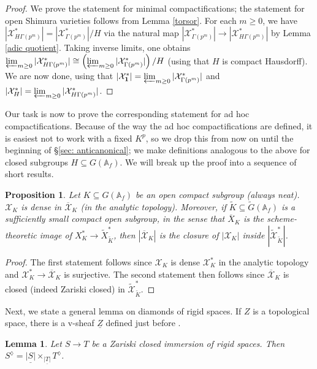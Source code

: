 \documentclass{amsart}
\newtheorem{lemma}[subsubsection]{Lemma}
\newtheorem{prop}[subsubsection]{Proposition}
\theoremstyle{remark}
\numberwithin{equation}{subsection}
\newcommand{\A}{\AA}
\renewcommand{\AA}{{\mathbb A}}
\newcommand{\cX}{{\mathcal X}}
\newcommand*{\invlim}{\varprojlim}
\newcommand{\mbf}{\mathbf}
\newcommand{\tG}{\widetilde{G}}
\newcommand{\tK}{{\widetilde{K}}}
\newcommand{\tX}{\widetilde{X}}
\newcommand{\tcX}{\widetilde{\mathcal{X}}}
\newcommand{\ocX}{\overline{\mathcal{X}}}
\newcommand{\ol}{\overline}
\newcommand{\ul}{\underline}
\newcommand{\sub}{\subseteq}
\renewcommand{\(}{\left(}
\renewcommand{\)}{\right)}
\begin{document}
\begin{proof}
We prove the statement for minimal compactifications; the statement for open Shimura varieties follows from Lemma \ref{torsor}. For each $m\geq 0$, we have $|\cX^{\ast}_{H \Gamma(p^{m})}|=|\cX^{\ast}_{\Gamma(p^{m})}|/H$ via the natural map $|\cX^{\ast}_{\Gamma(p^{m})}| \to |\cX^{\ast}_{H \Gamma(p^{m})}|$ by Lemma \ref{adic quotient}.  Taking inverse limits, one obtains $\varprojlim_{m\geq 0}|\cX^\ast_{H\Gamma(p^m)}| \cong \left( \varprojlim_{m\geq 0} |\cX^\ast_{\Gamma(p^m)}| \right) /H $ (using that $H$ is compact Hausdorff). We are now done, using that $|\cX_{\mbf{1}}^{\ast}|=\invlim_{m\geq 0}|\cX_{\Gamma(p^{m})}^{\ast}|$ and $|\cX^{\ast}_H|=\invlim_{m\geq 0}|\cX_{H\Gamma(p^{m})}^{\ast}|$.
\end{proof}

Our task is now to prove the corresponding statement for ad hoc compactifications. Because of the way the ad hoc compactifications are defined, it is easiest not to work with a fixed $K^p$, so we drop this from now on until the beginning of \S \ref{sec: anticanonical}; we make definitions analogous to the above for closed subgroups $H \sub G(\A_f)$. We will break up the proof into a sequence of short results.

\begin{prop}\label{ad hoc closure}
Let $K \sub G(\A_f)$ be an open compact subgroup (always neat). $\cX_K$ is dense in $\ocX_K$ (in the analytic topology). Moreover, if $\tK \sub \tG(\A_f)$ is a sufficiently small compact open subgroup, in the sense that $\ol{X}_K$ is the scheme-theoretic image of $X_K^* \to \tX^*_\tK$, then $|\ocX_K|$ is the closure of $|\cX_K|$ inside $|\tcX^\ast_\tK|$.
\end{prop}

\begin{proof}
The first statement follows since $\cX_K$ is dense $\cX^\ast_K$ in the analytic topology and $\cX^\ast_K \to \ocX_K$ is surjective. The second statement then follows since $\ocX_K$ is closed (indeed Zariski closed) in $\tcX_\tK^\ast$.
\end{proof}

Next, we state a general lemma on diamonds of rigid spaces. If $Z$ is a topological space, there is a v-sheaf $\ul{Z}$ defined just before \cite[Definition 10.12]{diamonds}.

\begin{lemma}\label{ad hoc Zariski closed}
Let $S \to T$ be a Zariski closed immersion of rigid spaces. Then $S^\lozenge = \ul{|S|}\times_{\ul{|T|}}T^\lozenge$.
\end{lemma}
\end{document}
